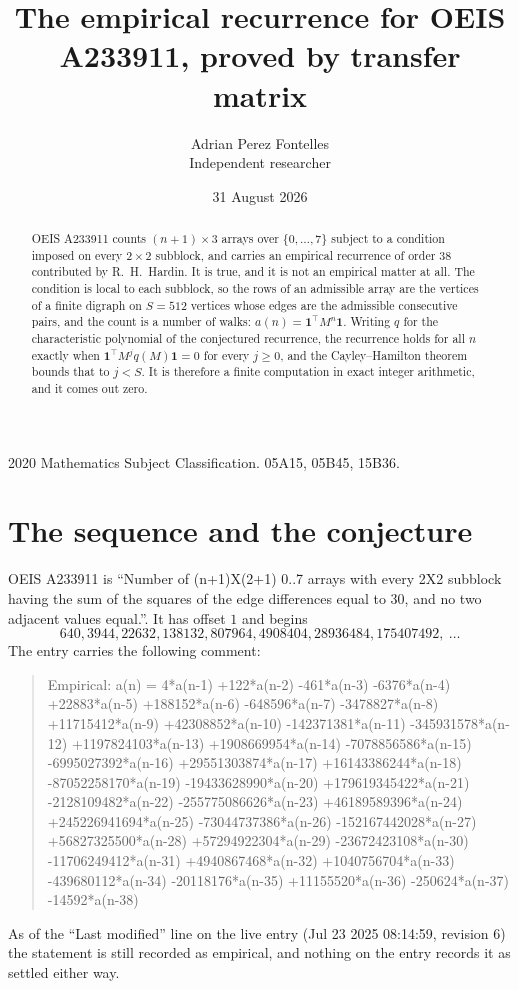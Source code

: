 \documentclass[11pt,a4paper]{article}
\title{The empirical recurrence for OEIS A233911, proved by transfer matrix}
\author{Adrian Perez Fontelles\\ \small Independent researcher}
\date{31 August 2026}
\theoremstyle{plain}
\theoremstyle{definition}
\begin{document}
\maketitle

\begin{abstract}
OEIS A233911 counts $(n+1)\times3$ arrays over $\{0,\dots,7\}$ subject to a condition imposed on
every $2\times2$ subblock, and carries an empirical recurrence of order $38$ contributed
by R.~H.~Hardin. It is true, and it is not an empirical matter at all. The condition is local
to each subblock, so the rows of an admissible array are the vertices of a finite digraph
on $S=512$ vertices whose edges are the admissible consecutive pairs, and the count is a
number of walks: $a(n)=\mathbf{1}^{\!\top}M^{n}\mathbf{1}$. Writing $q$
for the characteristic polynomial of the conjectured recurrence, the recurrence holds for all
$n$ exactly when $\mathbf{1}^{\!\top}M^{j}q(M)\mathbf{1}=0$ for every $j\ge0$, and the
Cayley--Hamilton theorem bounds that to $j<S$. It is therefore a finite computation in exact
integer arithmetic, and it comes out zero.
\end{abstract}

\noindent\small 2020 Mathematics Subject Classification. 05A15, 05B45, 15B36.\normalsize

\section{The sequence and the conjecture}

OEIS A233911 is ``Number of (n+1)X(2+1) 0..7 arrays with every 2X2 subblock having the sum of the squares of the edge differences equal to 30, and no two adjacent values equal.''. It has offset $1$ and begins
\[
640, 3944, 22632, 138132, 807964, 4908404, 28936484, 175407492,\ \dots
\]
The entry carries the following comment:
\begin{quote}\small
Empirical: a(n) = 4*a(n-1) +122*a(n-2) -461*a(n-3) -6376*a(n-4) +22883*a(n-5) +188152*a(n-6) -648596*a(n-7) -3478827*a(n-8) +11715412*a(n-9) +42308852*a(n-10) -142371381*a(n-11) -345931578*a(n-12) +1197824103*a(n-13) +1908669954*a(n-14) -7078856586*a(n-15) -6995027392*a(n-16) +29551303874*a(n-17) +16143386244*a(n-18) -87052258170*a(n-19) -19433628990*a(n-20) +179619345422*a(n-21) -2128109482*a(n-22) -255775086626*a(n-23) +46189589396*a(n-24) +245226941694*a(n-25) -73044737386*a(n-26) -152167442028*a(n-27) +56827325500*a(n-28) +57294922304*a(n-29) -23672423108*a(n-30) -11706249412*a(n-31) +4940867468*a(n-32) +1040756704*a(n-33) -439680112*a(n-34) -20118176*a(n-35) +11155520*a(n-36) -250624*a(n-37) -14592*a(n-38)
\end{quote}
As of the ``Last modified'' line on the live entry (Jul 23 2025 08:14:59, revision 6) the statement is
still recorded as empirical, and nothing on the entry records it as settled either way.
\end{document}

